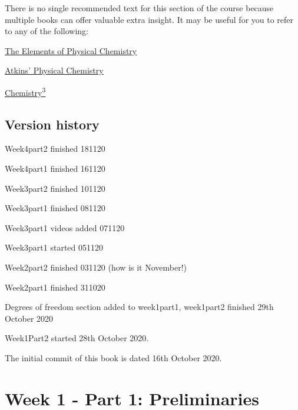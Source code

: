 \documentclass[
]{book}
\begin{document}
There is no single recommended text for this section of the course because multiple books can offer valuable extra insight. It may be useful for you to refer to any of the following:

\href{https://bath-ac-primo.hosted.exlibrisgroup.com/primo-explore/search?query=any,contains,Elements\%20of\%20physical\%20chemistry\&tab=local\&sortby=date\&vid=44BAT_VU1\&facet=frbrgroupid,include,978286819\&offset=0\&pcAvailability=false}{The Elements of Physical Chemistry}

\href{https://bath-ac-primo.hosted.exlibrisgroup.com/primo-explore/search?query=any,contains,physical\%20chemistry\%20de\%20paula\&tab=local\&search_scope=CSCOP_44BAT_DEEP\&sortby=date\&vid=44BAT_VU1\&facet=frbrgroupid,include,978327499\&offset=0\&pcAvailability=false}{Atkins' Physical Chemistry}

\href{https://bath-ac-primo.hosted.exlibrisgroup.com/primo-explore/search?query=any,contains,chemistry3\&tab=local\&search_scope=CSCOP_44BAT_DEEP\&sortby=date\&vid=44BAT_VU1\&facet=frbrgroupid,include,978293871\&offset=0\&pcAvailability=false}{Chemistry\textsuperscript{3}}

\hypertarget{version-history}{%
\section*{Version history}\label{version-history}}

Week4part2 finished 181120

Week4part1 finished 161120

Week3part2 finished 101120

Week3part1 finished 081120

Week3part1 videos added 071120

Week3part1 started 051120

Week2part2 finished 031120 (how is it November!)

Week2part1 finished 311020

Degrees of freedom section added to week1part1, week1part2 finished 29th October 2020

Week1Part2 started 28th October 2020.

The initial commit of this book is dated 16th October 2020.

\hypertarget{ch:Part1}{%
\chapter{Week 1 - Part 1: Preliminaries}\label{ch:Part1}}
\end{document}
